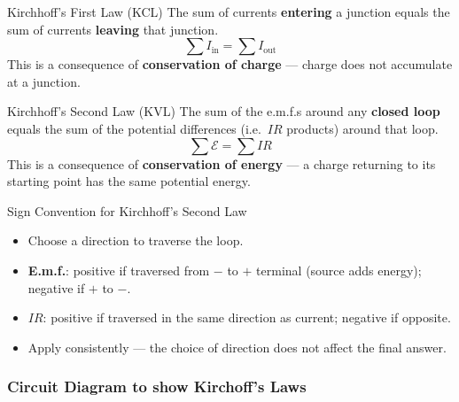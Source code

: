 \begin{definitionbox}{Kirchhoff's First Law (KCL)}
The sum of currents \textbf{entering} a junction equals the sum of currents \textbf{leaving} that junction.
$$\sum I_{\text{in}} = \sum I_{\text{out}}$$
This is a consequence of \textbf{conservation of charge} — charge does not accumulate at a junction.
\end{definitionbox}

\vspace{2em}

\begin{definitionbox}{Kirchhoff's Second Law (KVL)}
The sum of the e.m.f.s around any \textbf{closed loop} equals the sum of the potential differences (i.e.\ $IR$ products) around that loop.
$$\sum \mathcal{E} = \sum IR$$
This is a consequence of \textbf{conservation of energy} — a charge returning to its starting point has the same potential energy.
\end{definitionbox}

\vspace{2em}


\begin{keybox}{Sign Convention for Kirchhoff's Second Law}
\begin{itemize}[itemsep=2pt]
  \item Choose a direction to traverse the loop.
  \item \textbf{E.m.f.}: positive if traversed from $-$ to $+$ terminal (source adds energy); negative if $+$ to $-$.
  \item \textbf{$IR$}: positive if traversed in the same direction as current; negative if opposite.
  \item Apply consistently — the choice of direction does not affect the final answer.
\end{itemize}
\end{keybox}


\pagebreak


\subsubsection*{Circuit Diagram to show Kirchoff's Laws }

